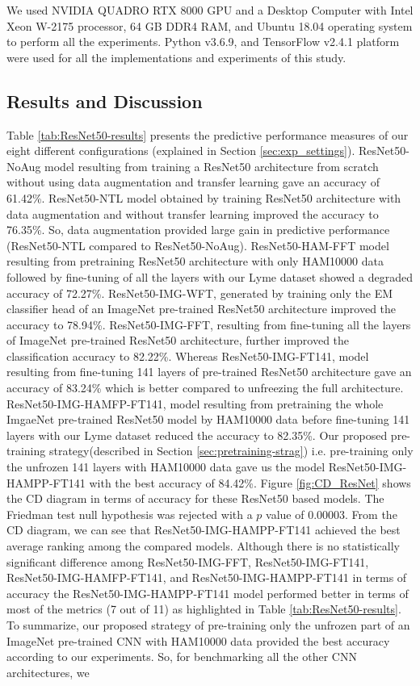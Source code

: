 We used NVIDIA QUADRO RTX 8000 GPU and a Desktop Computer with Intel Xeon W-2175 processor, 64 GB DDR4 RAM, and Ubuntu 18.04 operating system to perform all the experiments. Python v3.6.9, and TensorFlow v2.4.1 platform \cite{Abadi2016} were used for all the implementations and experiments of this study.

\subsection{Results and Discussion}\label{sec:pretrain-results}
Table \ref{tab:ResNet50-results} presents the predictive performance measures of our eight different configurations (explained in Section \ref{sec:exp_settings}). ResNet50-NoAug model resulting from training a ResNet50 architecture from scratch without using data augmentation and transfer learning gave an accuracy of 61.42\%. ResNet50-NTL model obtained by training ResNet50 architecture with data augmentation and without transfer learning improved the accuracy to 76.35\%. So, data augmentation provided large gain in predictive performance (ResNet50-NTL compared to ResNet50-NoAug). ResNet50-HAM-FFT model resulting from pretraining ResNet50 architecture with only HAM10000 data followed by fine-tuning of all the layers with our Lyme dataset showed a degraded accuracy of 72.27\%. ResNet50-IMG-WFT, generated by training only the EM classifier head of an ImageNet pre-trained ResNet50 architecture improved the accuracy to 78.94\%. ResNet50-IMG-FFT, resulting from fine-tuning all the layers of ImageNet pre-trained ResNet50 architecture, further improved the classification accuracy to 82.22\%. Whereas ResNet50-IMG-FT141, model resulting from fine-tuning 141 layers of pre-trained ResNet50 architecture gave an accuracy of 83.24\% which is better compared to unfreezing the full architecture. ResNet50-IMG-HAMFP-FT141, model resulting from pretraining the whole ImgaeNet pre-trained ResNet50 model by HAM10000 data before fine-tuning 141 layers with our Lyme dataset reduced the accuracy to 82.35\%. Our proposed pre-training strategy(described in Section \ref{sec:pretraining-strag}) i.e. pre-training only the unfrozen 141 layers with HAM10000 data gave us the model ResNet50-IMG-HAMPP-FT141 with the best accuracy of 84.42\%. Figure \ref{fig:CD_ResNet} shows the CD diagram in terms of accuracy for these ResNet50 based models. The Friedman test null hypothesis was rejected with a $p$ value of 0.00003. From the CD diagram, we can see that ResNet50-IMG-HAMPP-FT141 achieved the best average ranking among the compared models. Although there is no statistically significant difference among ResNet50-IMG-FFT, ResNet50-IMG-FT141, ResNet50-IMG-HAMFP-FT141, and ResNet50-IMG-HAMPP-FT141 in terms of accuracy the ResNet50-IMG-HAMPP-FT141 model performed better in terms of most of the metrics (7 out of 11) as highlighted in Table \ref{tab:ResNet50-results}. To summarize, our proposed  strategy of pre-training only the unfrozen part of an ImageNet pre-trained CNN with HAM10000 data provided the best accuracy according to our experiments. So, for benchmarking all the other CNN architectures, we 